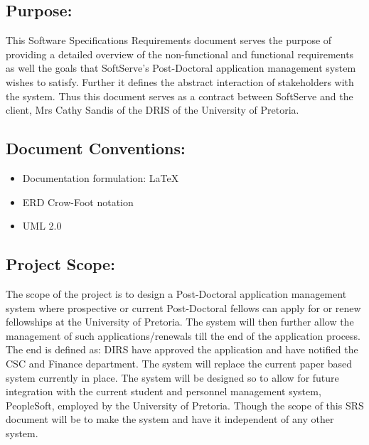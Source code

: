 \documentclass[12pt]{article}
\begin{document}
		\subsection{Purpose:}
		\vspace{0.2in}
		This Software Specifications Requirements document serves the purpose of providing a detailed overview of the non-functional and functional requirements as well the goals that SoftServe's Post-Doctoral application management system wishes to satisfy. Further it defines the abstract interaction of stakeholders with the system. Thus this document serves as a contract between SoftServe and the client, Mrs Cathy Sandis of the DRIS of the University of Pretoria.
	
		\vspace{0.2in}
	
		\subsection{Document Conventions:}
		\vspace{0.1in}
		\begin{itemize}
			\item Documentation formulation: LaTeX
			\item ERD Crow-Foot notation
			\item UML 2.0
		\end{itemize}
	
		\vspace{0.2in}
	
		\subsection{Project Scope:}
		\vspace{0.2in}		
		The scope of the project is to design a Post-Doctoral application management system where prospective or current Post-Doctoral fellows can apply for or renew fellowships at the University of Pretoria. The system will then further allow the management of such applications/renewals till the end of the application process. The end is defined as: DIRS have approved the application and have notified the CSC and Finance department. The system will replace the current paper based system currently in place. The system will be designed so to allow for future integration with the current student and personnel management system, PeopleSoft, employed by the University of Pretoria. Though the scope of this SRS document will be to make the system and have it independent of any other system.
		\vspace{0.2in}
	
\end{document}
